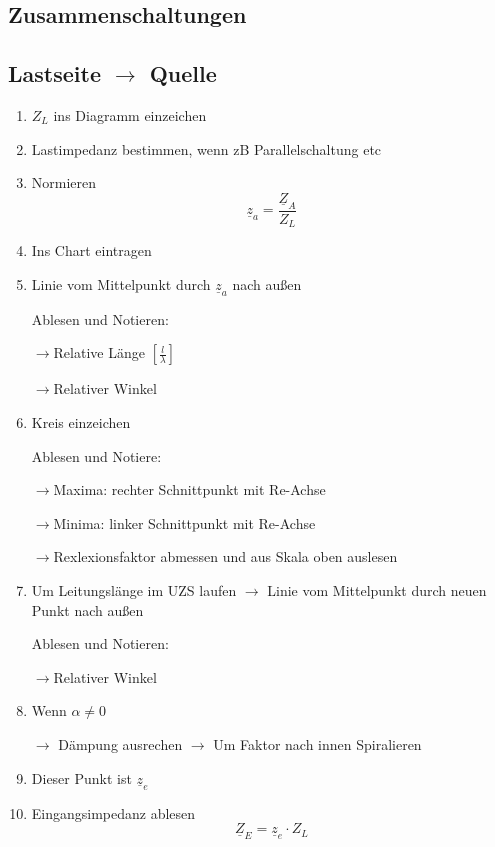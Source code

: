 \subsection{Zusammenschaltungen}

\columnbreak

\subsection[Von Last zu Quelle]{Lastseite $\rightarrow$ Quelle}
\begin{enumerate}
    \item $Z_L$ ins Diagramm einzeichen
    \item Lastimpedanz bestimmen,
          wenn zB Parallelschaltung etc
    \item Normieren
          \[\underline{z}_a = \frac{\underline{Z}_A}{Z_L} \]
    \item Ins Chart eintragen
    \item Linie vom Mittelpunkt durch $\underline{z}_a$ nach außen

          Ablesen und Notieren:

          $\rightarrow$Relative Länge $\left[\frac{l}{\lambda}\right]$

          $\rightarrow$Relativer Winkel
    \item Kreis einzeichen

          Ablesen und Notiere:

          $\rightarrow$Maxima: rechter Schnittpunkt mit Re-Achse

          $\rightarrow$Minima: linker  Schnittpunkt mit Re-Achse

          $\rightarrow$Rexlexionsfaktor abmessen und aus Skala oben auslesen
    \item Um Leitungslänge im UZS laufen
          $\rightarrow$ Linie vom Mittelpunkt durch neuen Punkt nach außen

          Ablesen und Notieren:

          $\rightarrow$Relativer Winkel
    \item Wenn $\alpha\neq 0$

          $\rightarrow$ Dämpung ausrechen
          $\rightarrow$ Um Faktor nach innen Spiralieren

    \item Dieser Punkt ist $\underline{z}_e$
    \item Eingangsimpedanz ablesen
          \[\underline{Z}_E = \underline{z}_e \cdot Z_L\]
\end{enumerate}
  